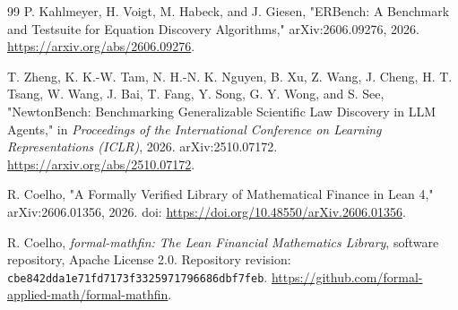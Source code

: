 \begin{thebibliography}{99}
P. Kahlmeyer, H. Voigt, M. Habeck, and J. Giesen,
"ERBench: A Benchmark and Testsuite for Equation Discovery Algorithms,"
arXiv:2606.09276, 2026.
\url{https://arxiv.org/abs/2606.09276}.

T. Zheng, K. K.-W. Tam, N. H.-N. K. Nguyen, B. Xu, Z. Wang, J. Cheng,
H. T. Tsang, W. Wang, J. Bai, T. Fang, Y. Song, G. Y. Wong, and S. See,
"NewtonBench: Benchmarking Generalizable Scientific Law Discovery in LLM Agents,"
in \emph{Proceedings of the International Conference on Learning
Representations (ICLR)}, 2026.
arXiv:2510.07172.
\url{https://arxiv.org/abs/2510.07172}.

R. Coelho,
"A Formally Verified Library of Mathematical Finance in Lean 4,"
arXiv:2606.01356, 2026.
doi: \url{https://doi.org/10.48550/arXiv.2606.01356}.

R. Coelho,
\emph{formal-mathfin: The Lean Financial Mathematics Library},
software repository, Apache License 2.0.
Repository revision: \texttt{cbe842dda1e71fd7173f3325971796686dbf7feb}.
\url{https://github.com/formal-applied-math/formal-mathfin}.

\end{thebibliography}
